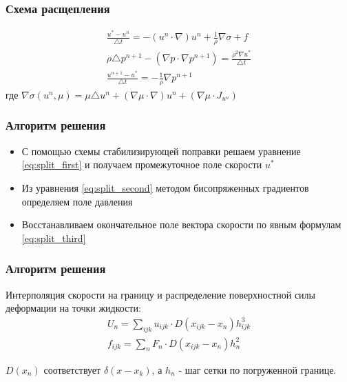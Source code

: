 \documentclass[14pt]{beamer}
\begin{document}
\begin{frame}
\frametitle{Схема расщепления}
\begin{gather}
    \label{eq:split_first}
    \frac{u^* - u^n}{\triangle t} = - (u^n \cdot \nabla) u^n + \frac{1}{\rho} \nabla \sigma + f\\
    \label{eq:split_second}
    \rho \triangle p^{n+1} - (\nabla p \cdot \nabla p^{n+1}) = \frac{\rho^2 \nabla u^*}{\triangle t}\\
    \label{eq:split_third}
    \frac{u^{n+1} - u^*}{\triangle t} = - \frac{1}{\rho} \nabla p^{n+1}
\end{gather}
где $\nabla \sigma (u^n, \mu) = \mu \triangle u^n + (\nabla \mu \cdot \nabla) u^n + (\nabla \mu \cdot J_{u^n}) $
\end{frame}

\begin{frame}
\frametitle{Алгоритм решения}
    \begin{itemize}
        \item \alert<+>{С помощью схемы стабилизирующей поправки решаем уравнение \eqref{eq:split_first} и получаем промежуточное поле скорости $u^*$}
        \item \alert<+>{Из уравнения \eqref{eq:split_second} методом бисопряженных градиентов определяем поле давления}
        \item \alert<+>{Восстанавливаем окончательное поле вектора скорости по явным формулам \eqref{eq:split_third}}
    \end{itemize}
\end{frame}

\begin{frame}
\frametitle{Алгоритм решения}
Интерполяция скорости на границу и распределение поверхностной силы деформации на точки жидкости:
\begin{gather}
    \label{eq:interpolation}
    U_n = \sum_{ijk}u_{ijk} \cdot D(x_{ijk} - x_n) h_{ijk}^3 \\
    \label{eq:spreading}
    f_{ijk} = \sum_n F_n \cdot D(x_{ijk} - x_n) h^2_n
\end{gather}

$D(x_n)$ соответствует $\delta(x - x_k)$, а $h_n$ - шаг сетки по погруженной границе.
\end{frame}
\end{document}
